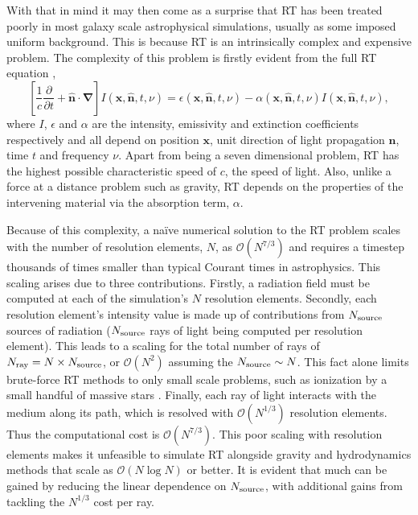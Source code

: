 \documentclass[fleq,usenatbib]{mnras}
\newcommand{\bigO}[1]{\mathcal{O}\left(#1\right)}
\newcommand{\NS}{N_{\rm source}}
\newcommand{\NR}{N_{\rm ray}}
\begin{document}
With that in mind it may then come as a surprise that RT has been treated 
poorly in most galaxy scale astrophysical simulations, usually as some 
imposed uniform background. This is because RT is an intrinsically complex and 
expensive problem. The complexity of this problem is firstly evident from the 
full RT equation 
\citep[e.g.][]{mihalasMihalas84},
\begin{equation} \label{eqn:classicrt}
\left[ \frac{1}{c} \frac{\partial}{\partial t} + \mathbf{\hat{n} \cdot \nabla}
 \right] I\left(\mathbf{x}, \mathbf{\hat{n}}, t, \nu\right) = 
\epsilon\left(\mathbf{x}, \mathbf{\hat{n}}, t, \nu\right) - 
\alpha\left(\mathbf{x}, \mathbf{\hat{n}}, t, \nu\right) 
I\left(\mathbf{x}, \mathbf{\hat{n}}, t, \nu\right),
\end{equation} 
where $I$, $\epsilon$ and $\alpha$ are the intensity, emissivity and 
extinction coefficients respectively and all depend on position $\mathbf{x}$, 
unit direction of light propagation $\mathbf{\hat{n}}$, time $t$ and frequency 
$\nu$. Apart from being a seven dimensional problem, RT has the highest 
possible characteristic speed of $c$, the speed of light. Also, unlike a force 
at a distance problem such as gravity, RT depends on the properties of the 
intervening material via the absorption term, $\alpha$.

Because of this complexity, a na\"ive numerical solution to the RT problem 
scales with the number of resolution elements, $N$, as $\bigO{N^{7/3}}$ and 
requires a timestep thousands of times smaller than typical Courant times in 
astrophysics. This scaling arises due to three contributions. Firstly, a 
radiation field must be computed at each of the simulation's $N$ resolution 
elements. Secondly, each resolution element's intensity value is made up of 
contributions from $\NS$ sources of radiation ($\NS$ rays of light being 
computed per resolution element). This leads to a scaling for the total number 
of rays of $\NR = N \times \NS$, or $\bigO{N^2}$ assuming the $\NS \sim N$. 
This fact alone limits brute-force RT methods to only small scale problems, 
such as ionization by a small handful of massive stars \citep{howard16, 
howard17}. Finally, each ray of light interacts with the medium along its 
path, which is resolved with $\bigO{N^{1/3}}$ resolution elements. Thus the 
computational cost is $\bigO{N^{7/3}}$. This poor scaling with resolution 
elements makes it unfeasible to simulate RT alongside gravity and 
hydrodynamics methods that scale as $\bigO{N\log N}$ or better. It is evident 
that much can be gained by reducing the linear dependence on $\NS$, with 
additional gains from tackling the $N^{1/3}$ cost per ray.
\end{document}
